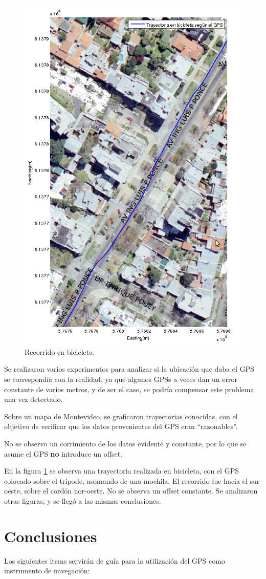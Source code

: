 \documentclass[main]{subfiles}
\begin{document}
\begin{figure}
  \begin{center}
\vspace{-90pt}
  \includegraphics[height=.5\textwidth]{./pics_gps/ponce.png}
  \end{center}
\vspace{-20pt}
  \caption{Recorrido en bicicleta.}
  \label{fig:ponce.png}
\vspace{-20pt}
\end{figure}

Se realizaron varios experimentos para analizar si la ubicación que daba el GPS se correspondía con la realidad, ya que algunos GPSs a veces dan un error constante de varios metros, y de ser el caso, se podría compensar este problema una vez detectado.

Sobre un mapa de Montevideo, se graficaron trayectorias conocidas, con el objetivo de verificar que los datos provenientes del GPS eran ``razonables''.

No se observo un corrimiento de los datos evidente y constante, por lo que se asume el GPS \textbf{no} introduce un offset.

En la figura \ref{fig:ponce.png} se observa una trayectoria realizada en bicicleta, con el GPS colocado sobre el trípode, asomando de una mochila. El recorrido fue hacia el sur-oeste, sobre el cord\'on nor-oeste. No se observa un offset constante. Se analizaron otras figuras, y se lleg\'o a las mismas conclusiones.

\section{Conclusiones}
\label{sec:conclusion}

Los siguientes items servirán de guía para la utilización del GPS como instrumento de navegación:
\end{document}
